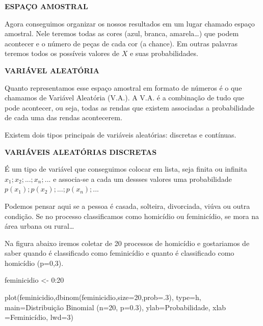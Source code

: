 \documentclass[
  letterpaper,
  DIV=11,
  numbers=noendperiod]{scrreprt}
\newenvironment{Shaded}{\begin{snugshade}}{\end{snugshade}}
\newcommand{\AttributeTok}[1]{\textcolor[rgb]{0.40,0.45,0.13}{#1}}
\newcommand{\DecValTok}[1]{\textcolor[rgb]{0.68,0.00,0.00}{#1}}
\newcommand{\FunctionTok}[1]{\textcolor[rgb]{0.28,0.35,0.67}{#1}}
\newcommand{\NormalTok}[1]{\textcolor[rgb]{0.00,0.23,0.31}{#1}}
\newcommand{\OtherTok}[1]{\textcolor[rgb]{0.00,0.23,0.31}{#1}}
\newcommand{\SpecialCharTok}[1]{\textcolor[rgb]{0.37,0.37,0.37}{#1}}
\newcommand{\StringTok}[1]{\textcolor[rgb]{0.13,0.47,0.30}{#1}}
\begin{document}
\textbf{ESPAÇO AMOSTRAL}

Agora conseguimos organizar os nossos resultados em um lugar chamado
espaço amostral. Nele teremos todas as cores (azul, branca,
amarela\ldots) que podem acontecer e o número de peças de cada cor (a
chance). Em outras palavras teremos todos os possíveis valores de \(X\)
e suas probabilidades.

\textbf{VARIÁVEL ALEATÓRIA}

Quanto representamos esse espaço amostral em formato de números é o que
chamamos de Variável Aleatória (V.A.). A V.A. é a combinação de tudo que
pode acontecer, ou seja, todas as rendas que existem associadas a
probabilidade de cada uma das rendas acontecerem.

Existem dois tipos principais de variáveis aleatórias: discretas e
contínuas.

\textbf{VARIÁVEIS ALEATÓRIAS DISCRETAS}

É um tipo de variável que conseguimos colocar em lista, seja finita ou
infinita \(x_1; x_2;...; x_n;...\) e associa-se a cada um dessses
valores uma probabilidade \(p(x_1); p(x_2);...; p(x_n);...\)

Podemos pensar aqui se a pessoa é casada, solteira, divorciada, viúva ou
outra condição. Se no processo classificamos como homicídio ou
feminicídio, se mora na área urbana ou rural\ldots{}

Na figura abaixo iremos coletar de 20 processos de homicídio e
gostariamos de saber quando é classificado como feminicídio e quanto é
classificado como homicídio (p=0,3).

\begin{Shaded}
\begin{Highlighting}[]
\NormalTok{feminicidio }\OtherTok{\textless{}{-}} \DecValTok{0}\SpecialCharTok{:}\DecValTok{20}

\FunctionTok{plot}\NormalTok{(feminicidio,}\FunctionTok{dbinom}\NormalTok{(feminicidio,}\AttributeTok{size=}\DecValTok{20}\NormalTok{,}\AttributeTok{prob=}\NormalTok{.}\DecValTok{3}\NormalTok{),}
     \AttributeTok{type=}\StringTok{\textquotesingle{}h\textquotesingle{}}\NormalTok{,}
     \AttributeTok{main=}\StringTok{\textquotesingle{}Distribuição Binomial (n=20, p=0.3)\textquotesingle{}}\NormalTok{,}
     \AttributeTok{ylab=}\StringTok{\textquotesingle{}Probabilidade\textquotesingle{}}\NormalTok{,}
     \AttributeTok{xlab =}\StringTok{\textquotesingle{}Feminicídio\textquotesingle{}}\NormalTok{,}
     \AttributeTok{lwd=}\DecValTok{3}\NormalTok{)}
\end{Highlighting}
\end{Shaded}
\end{document}
